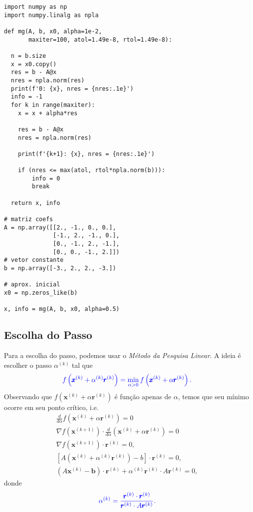 \begin{ex}
\begin{lstlisting}[caption = mg.py, label=cap_sislin_sec_metg:cod:mg.py]
import numpy as np
import numpy.linalg as npla

def mg(A, b, x0, alpha=1e-2,
       maxiter=100, atol=1.49e-8, rtol=1.49e-8):
    
  n = b.size
  x = x0.copy()
  res = b - A@x
  nres = npla.norm(res)
  print(f'0: {x}, nres = {nres:.1e}')
  info = -1
  for k in range(maxiter):
    x = x + alpha*res
    
    res = b - A@x
    nres = npla.norm(res)

    print(f'{k+1}: {x}, nres = {nres:.1e}')

    if (nres <= max(atol, rtol*npla.norm(b))):
        info = 0
        break

  return x, info
            
# matriz coefs
A = np.array([[2., -1., 0., 0.],
              [-1., 2., -1., 0.],
              [0., -1., 2., -1.],
              [0., 0., -1., 2.]])
# vetor constante
b = np.array([-3., 2., 2., -3.])

# aprox. inicial
x0 = np.zeros_like(b)

x, info = mg(A, b, x0, alpha=0.5)
\end{lstlisting}

\end{ex}

\subsection{Escolha do Passo}

Para a escolha do passo, podemos usar o \emph{Método da Pesquisa Linear}. A ideia é escolher o passo $\alpha^{(k)}$ tal que
\begin{equation}\color{blue}f\left(\pmb{x}^{(k)}+\alpha^{(k)}\pmb{r}^{(k)}\right) = \min_{\alpha > 0} f\left(\pmb{x}^{(k)}+\alpha\pmb{r}^{(k)}\right).
\end{equation}
Observando que $f(\pmb{x}^{(k)}+\alpha\pmb{r}^{(k)})$ é função apenas de $\alpha$, temos que seu mínimo ocorre em seu ponto crítico, i.e.
\begin{gather}
  \frac{d}{d\alpha}f\left(\pmb{x}^{(k)}+\alpha \pmb{r}^{(k)}\right) = 0 \\
  \nabla f\left(\pmb{x}^{(k+1)}\right)\cdot \frac{d}{d\alpha}\left(\pmb{x}^{(k)}+\alpha \pmb{r}^{(k)}\right) = 0 \\
  \nabla f(\pmb{x}^{(k+1)})\cdot \pmb{r}^{(k)} = 0,\\
  \left[A\left(\pmb{x}^{(k)}+\alpha^{(k)}\pmb{r}^{(k)}\right)-b\right]\cdot\pmb{r}^{(k)} = 0,\\
 \left(A\pmb{x}^{(k)}-\pmb{b}\right)\cdot\pmb{r}^{(k)}+\alpha^{(k)}\pmb{r}^{(k)}\cdot A\pmb{r}^{(k)} = 0,
\end{gather}
donde
\begin{equation}\label{cap_sislin_sec_metg:eq:mg_pl}\color{blue}\alpha^{(k)} = \frac{\pmb{r}^{(k)}\cdot\pmb{r}^{(k)}}{\pmb{r}^{(k)}\cdot A\pmb{r}^{(k)}}.
\end{equation}

